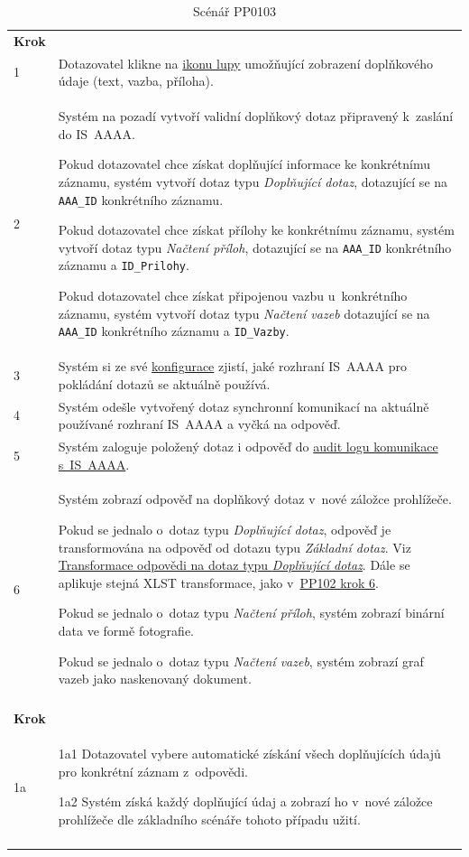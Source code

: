 \documentclass[thesis=M,czech]{FITthesis}[2019/12/23]
\begin{document}
\newpage
	\begin{longtable}{|p{}|p{}|}
		\rowcolor{Gray}\multicolumn{2}{|l|}{\textbf{Základní scénář}} \\ \hline
		\textbf{Krok} & \\ \hline
		1 & Dotazovatel klikne na \hyperref[O04DetailKandidata]{ikonu lupy} umožňující zobrazení doplňkového údaje (text, vazba, příloha). \\ \hline
		2 & Systém na pozadí vytvoří validní doplňkový dotaz připravený k~zaslání do IS~AAAA.

Pokud dotazovatel chce získat doplňující informace ke konkrétnímu záznamu, systém vytvoří dotaz typu \textit{Doplňující dotaz}, dotazující se na \texttt{AAA\_ID} konkrétního záznamu.

Pokud dotazovatel chce získat přílohy ke konkrétnímu záznamu, systém vytvoří dotaz typu \textit{Načtení příloh}, dotazující se na \texttt{AAA\_ID} konkrétního záznamu a \texttt{ID\_Prilohy}.

Pokud dotazovatel chce získat připojenou vazbu u~konkrétního záznamu, systém vytvoří dotaz typu \textit{Načtení vazeb} dotazující se na \texttt{AAA\_ID} konkrétního záznamu a \texttt{ID\_Vazby}.
 \\ \hline
		3 & Systém si ze své \hyperref[Konfigurace]{konfigurace} zjistí, jaké rozhraní IS~AAAA pro pokládání dotazů se aktuálně používá. \\ \hline
		4 & Systém odešle vytvořený dotaz synchronní komunikací na aktuálně používané rozhraní IS~AAAA a vyčká na odpověď. \\ \hline
		5 & Systém zaloguje položený dotaz i odpověď do \hyperref[Logy]{audit logu komunikace s~IS~AAAA}. \\ \hline
		6 & Systém zobrazí odpověď na doplňkový dotaz v~nové záložce prohlížeče.

Pokud se jednalo o~dotaz typu \textit{Doplňující dotaz}, odpověď je transformována na odpověď od dotazu typu \textit{Základní dotaz}. Viz \hyperref[cqrd]{Transformace odpovědi na dotaz typu \textit{Doplňující dotaz}}.
Dále se aplikuje stejná XLST transformace, jako v~\hyperref[ZaslaniDoISAAA]{PP102 krok 6}.

Pokud se jednalo o~dotaz typu \textit{Načtení příloh}, systém zobrazí binární data ve formě fotografie.

Pokud se jednalo o~dotaz typu \textit{Načtení vazeb}, systém zobrazí graf vazeb jako naskenovaný dokument.
 \\ \hline
		\rowcolor{Gray}\multicolumn{2}{|l|}{\textbf{Alternativní scénáře}} \\ \hline
		\textbf{Krok} & \\ \hline
		1a &
		1a1 Dotazovatel vybere automatické získání všech doplňujících údajů pro konkrétní záznam z~odpovědi.

		1a2 Systém získá každý doplňující údaj a zobrazí ho v~nové záložce prohlížeče dle základního scénáře tohoto případu užití.
\\ \hline
		\caption{Scénář PP0103}
		\label{tab:Scénář PP0103}
	\end{longtable}
\end{document}
